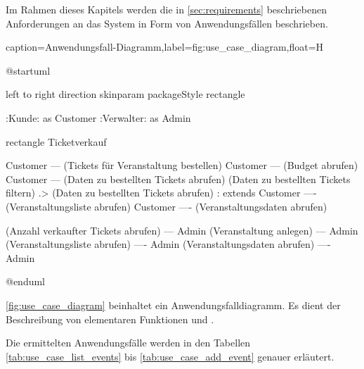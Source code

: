 Im Rahmen dieses Kapitels werden die in \autoref{sec:requirements} beschriebenen Anforderungen an das System in Form von Anwendungsfällen beschrieben. 

\begin{dhbwfigure}{caption=Anwendungsfall-Diagramm,label=fig:use_case_diagram,float=H}
    \begin{plantuml}
        @startuml

            left to right direction
            skinparam packageStyle rectangle

            :Kunde: as Customer
            :Verwalter: as Admin

            rectangle Ticketverkauf {
                Customer --- (Tickets für Veranstaltung bestellen)
                Customer --- (Budget abrufen)
                Customer --- (Daten zu bestellten Tickets abrufen)
                (Daten zu bestellten Tickets filtern) .> (Daten zu bestellten Tickets abrufen) : extends
                Customer ---- (Veranstaltungsliste abrufen)
                Customer ---- (Veranstaltungsdaten abrufen)

                (Anzahl verkaufter Tickets abrufen) --- Admin
                (Veranstaltung anlegen) --- Admin
                (Veranstaltungsliste abrufen) ---- Admin
                (Veranstaltungsdaten abrufen) ---- Admin
            }
        @enduml
    \end{plantuml}
\end{dhbwfigure}

\autoref{fig:use_case_diagram} beinhaltet ein Anwendungsfalldiagramm.
Es dient der Beschreibung von elementaren Funktionen und .

Die ermittelten Anwendungsfälle werden in den Tabellen \ref{tab:use_case_list_events} bis \ref{tab:use_case_add_event} genauer erläutert. %

